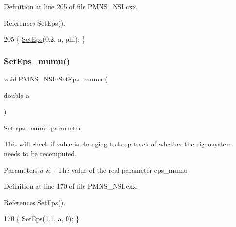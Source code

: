 Definition at line 205 of file P\+M\+N\+S\+\_\+\+N\+S\+I.\+cxx.



References Set\+Eps().


\begin{DoxyCode}
205 \{ \hyperlink{classOscProb_1_1PMNS__NSI_a87c508149ea36b6de493a6817247a0ea}{SetEps}(0,2, a, phi); \}
\end{DoxyCode}
\mbox{\label{classOscProb_1_1PMNS__NSI_abf049db9904c745f04346d0d1dedf998}} 
\subsubsection{\texorpdfstring{Set\+Eps\+\_\+mumu()}{SetEps\_mumu()}}
{\footnotesize\ttfamily void P\+M\+N\+S\+\_\+\+N\+S\+I\+::\+Set\+Eps\+\_\+mumu (\begin{DoxyParamCaption}\item[{double}]{a }\end{DoxyParamCaption})\hspace{0.3cm}{\ttfamily [virtual]}}

Set eps\+\_\+mumu parameter

This will check if value is changing to keep track of whether the eigensystem needs to be recomputed.


\begin{DoxyParams}{Parameters}
{\em a} & -\/ The value of the real parameter eps\+\_\+mumu \\
\hline
\end{DoxyParams}


Definition at line 170 of file P\+M\+N\+S\+\_\+\+N\+S\+I.\+cxx.



References Set\+Eps().


\begin{DoxyCode}
170 \{ \hyperlink{classOscProb_1_1PMNS__NSI_a87c508149ea36b6de493a6817247a0ea}{SetEps}(1,1, a, 0); \}
\end{DoxyCode}
\mbox{\label{classOscProb_1_1PMNS__NSI_acfb9893697e04fcc25915ffaf8ed137f}} 
